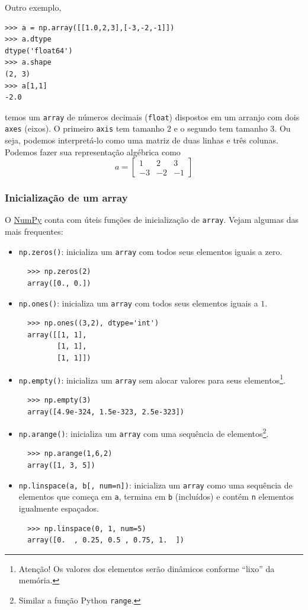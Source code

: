 \documentclass[12pt]{article}
\begin{document}
Outro exemplo,
\begin{lstlisting}
>>> a = np.array([[1.0,2,3],[-3,-2,-1]])
>>> a.dtype
dtype('float64')
>>> a.shape
(2, 3)
>>> a[1,1]
-2.0
\end{lstlisting}
temos um \lstinline+array+ de números decimais (\lstinline+float+) dispostos em um arranjo com dois \lstinline+axes+ (eixos). O primeiro \lstinline+axis+ tem tamanho $2$ e o segundo tem tamanho $3$. Ou seja, podemos interpretá-lo como uma matriz de duas linhas e três colunas. Podemos fazer sua representação algébrica como
\begin{equation}
  a =
  \begin{bmatrix}
    1 & 2 & 3\\
    -3 & -2 & -1 
  \end{bmatrix}
\end{equation}

\subsubsection{Inicialização de um array}\label{subsubsection:iniarray}

O \href{https://numpy.org/}{NumPy} conta com úteis funções de inicialização de \lstinline+array+. Vejam algumas das mais frequentes:
\begin{itemize}
\item \lstinline+np.zeros()+: inicializa um \lstinline+array+ com todos seus elementos iguais a zero.
  \begin{lstlisting}
  >>> np.zeros(2)
  array([0., 0.])
  \end{lstlisting}
\item \lstinline+np.ones()+: inicializa um \lstinline+array+ com todos seus elementos iguais a $1$.
  \begin{lstlisting}
  >>> np.ones((3,2), dtype='int')
  array([[1, 1],
         [1, 1],
         [1, 1]])
  \end{lstlisting}
\item \lstinline+np.empty()+: inicializa um \lstinline+array+ sem alocar valores para seus elementos\footnote{Atenção! Os valores dos elementos serão dinâmicos conforme ``lixo'' da memória.}.
  \begin{lstlisting}
  >>> np.empty(3)
  array([4.9e-324, 1.5e-323, 2.5e-323])
  \end{lstlisting}
\item \lstinline+np.arange()+: inicializa um \lstinline+array+ com uma sequência de elementos\footnote{Similar a função Python \lstinline+range+.}.
  \begin{lstlisting}
  >>> np.arange(1,6,2)
  array([1, 3, 5])
  \end{lstlisting}
\item \lstinline+np.linspace(a, b[, num=n])+: inicializa um \lstinline+array+ como uma sequência de elementos que começa em \lstinline+a+, termina em \lstinline+b+ (incluídos) e contém \lstinline+n+ elementos igualmente espaçados.
  \begin{lstlisting}
  >>> np.linspace(0, 1, num=5)
  array([0.  , 0.25, 0.5 , 0.75, 1.  ])
  \end{lstlisting}
\end{itemize}
\end{document}
